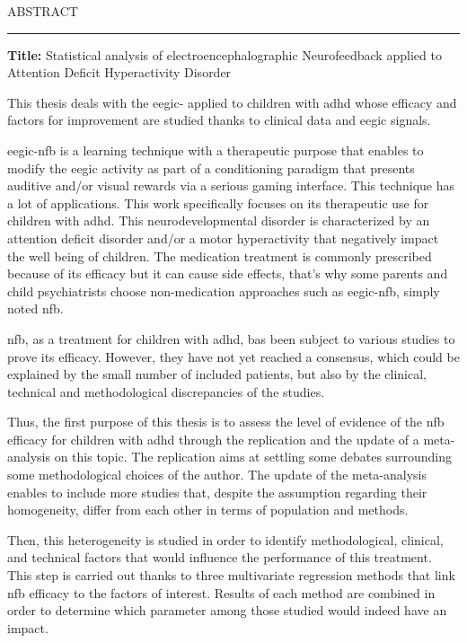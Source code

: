 

\begin{center}
\MakeUppercase{\LARGE{A}\Large{bstract}} \\
\noindent\rule{16cm}{0.4pt}
\end{center}

\textbf{Title:} Statistical analysis of electroencephalographic Neurofeedback applied to Attention Deficit Hyperactivity Disorder

This thesis deals with the \gls{eegic}- applied to children with \gls{adhd} whose efficacy and factors for 
improvement are studied thanks to clinical data and \gls{eegic} signals.

\gls{eegic}-\gls{nfb} is a learning technique with a therapeutic purpose that enables to modify the \gls{eegic} activity 
as part of a conditioning paradigm that presents auditive and/or visual rewards via a serious gaming interface.
This technique has a lot of applications. This work specifically focuses on its therapeutic use for children with \gls{adhd}.
This neurodevelopmental disorder is characterized by an attention deficit disorder and/or a motor hyperactivity that
negatively impact the well being of children. The medication treatment is commonly prescribed because of its efficacy but
it can cause side effects, that's why some parents and child psychiatrists choose non-medication approaches such as \gls{eegic}-\gls{nfb}, simply noted 
\gls{nfb}. 

\gls{nfb}, as a treatment for children with \gls{adhd}, bas been subject to various studies to prove its efficacy. 
However, they have not yet reached a consensus, which could be explained by the small number of included patients, but also by
the clinical, technical and methodological discrepancies of the studies.  

Thus, the first purpose of this thesis is to assess the level of evidence of the \gls{nfb} efficacy for children with \gls{adhd}
through the replication and the update of a meta-analysis on this topic. 
The replication aims at settling some debates surrounding some methodological choices of the author. 
The update of the meta-analysis enables to include more studies that, despite the assumption regarding their homogeneity, 
differ from each other in terms of population and methods.

Then, this heterogeneity is studied in order to identify methodological, clinical, and technical factors that would influence
the performance of this treatment. This step is carried out thanks to three multivariate regression methods that link \gls{nfb} 
efficacy to the factors of interest. Results of each method are combined in order to determine which parameter among those
studied would indeed have an impact. 

